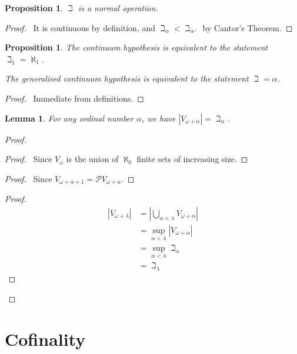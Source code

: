 \documentclass{book}
\let\qed\relax
\newtheorem{prop}[ax]{Proposition}
\newtheorem{lm}[ax]{Lemma}
\theoremstyle{definition}
\begin{document}
\begin{prop}
$\beth$ is a normal operation.
\end{prop}

\begin{proof}
\pf\ It is continuous by definition, and $\beth_\alpha < \beth_{\alpha^+}$ by Cantor's Theorem. \qed
\end{proof}

\begin{prop}
The continuum hypothesis is equivalent to the statement $\beth_1 = \aleph_1$.

The generalised continuum hypothesis is equivalent to the statement $\beth = \alpha$.
\end{prop}

\begin{proof}
\pf\ Immediate from definitions. \qed
\end{proof}

\begin{lm}
For any ordinal number $\alpha$, we have $|V_{\omega + \alpha}| = \beth_\alpha$.
\end{lm}

\begin{proof}
\pf
{}
\begin{proof}
	\pf\ Since $V_\omega$ is the union of $\aleph_0$ finite sets of increasing size.
\end{proof}
\begin{proof}
	\pf\ Since $V_{\omega + \alpha + 1} = \mathcal{P} V_{\omega + \alpha}$.
\end{proof}
\begin{proof}
	\pf
	\begin{align*}
		|V_{\omega + \lambda}| & = \left| \bigcup_{\alpha < \lambda} V_{\omega + \alpha} \right| \\
		& = \sup_{\alpha < \lambda} |V_{\omega + \alpha}| \\
		& = \sup_{\alpha < \lambda} \beth_\alpha \\
		& = \beth_\lambda
	\end{align*}
\end{proof}
\qed
\end{proof}

\section{Cofinality}
\end{document}
